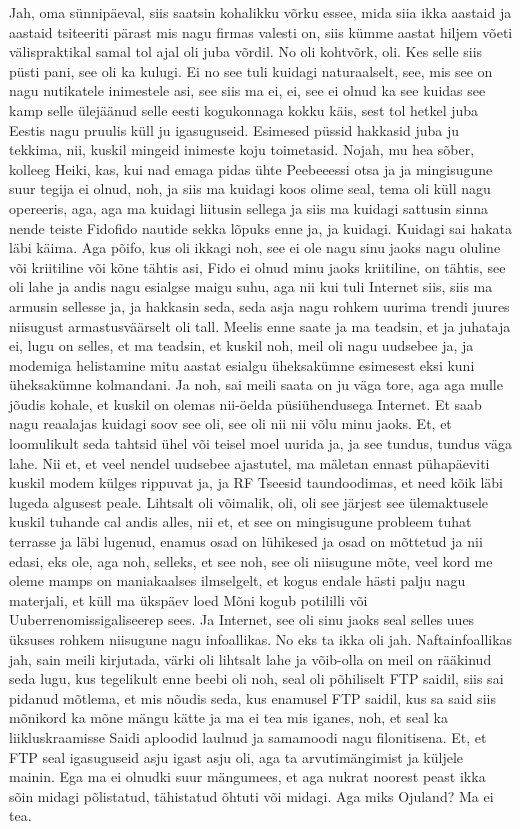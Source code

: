 Jah, oma sünnipäeval, siis saatsin kohalikku võrku essee, mida siia ikka aastaid ja aastaid tsiteeriti pärast mis nagu firmas valesti on, siis kümme aastat hiljem võeti välispraktikal samal tol ajal oli juba võrdil. No oli kohtvõrk, oli. Kes selle siis püsti pani, see oli ka kulugi. Ei no see tuli kuidagi naturaalselt, see, mis see on nagu nutikatele inimestele asi, see siis ma ei, ei, see ei olnud ka see kuidas see kamp selle ülejäänud selle eesti kogukonnaga kokku käis, sest tol hetkel juba Eestis nagu pruulis küll ju igasuguseid. Esimesed püssid hakkasid juba ju tekkima, nii, kuskil mingeid inimeste koju toimetasid. Nojah, mu hea sõber, kolleeg Heiki, kas, kui nad emaga pidas ühte Peebeeessi otsa ja ja mingisugune suur tegija ei olnud, noh, ja siis ma kuidagi koos olime seal, tema oli küll nagu opereeris, aga, aga ma kuidagi liitusin sellega ja siis ma kuidagi sattusin sinna nende teiste Fidofido nautide sekka lõpuks enne ja, ja kuidagi. Kuidagi sai hakata läbi käima. Aga põifo, kus oli ikkagi noh, see ei ole nagu sinu jaoks nagu oluline või kriitiline või kõne tähtis asi, Fido ei olnud minu jaoks kriitiline, on tähtis, see oli lahe ja andis nagu esialgse maigu suhu, aga nii kui tuli Internet siis, siis ma armusin sellesse ja, ja hakkasin seda, seda asja nagu rohkem uurima trendi juures niisugust armastusväärselt oli tall.
Meelis enne saate ja ma teadsin, et ja juhataja ei, lugu on selles, et ma teadsin, et kuskil noh, meil oli nagu uudsebee ja, ja modemiga helistamine mitu aastat esialgu üheksakümne esimesest eksi kuni üheksakümne kolmandani. Ja noh, sai meili saata on ju väga tore, aga aga mulle jõudis kohale, et kuskil on olemas nii-öelda püsiühendusega Internet. Et saab nagu reaalajas kuidagi soov see oli, see oli nii nii võlu minu jaoks. Et, et loomulikult seda tahtsid ühel või teisel moel uurida ja, ja see tundus, tundus väga lahe. Nii et, et veel nendel uudsebee ajastutel, ma mäletan ennast pühapäeviti kuskil modem külges rippuvat ja, ja RF Tseesid taundoodimas, et need kõik läbi lugeda algusest peale.
Lihtsalt oli võimalik, oli, oli see järjest see ülemaktusele kuskil tuhande cal andis alles, nii et, et see on mingisugune probleem tuhat terrasse ja läbi lugenud, enamus osad on lühikesed ja osad on mõttetud ja nii edasi, eks ole, aga noh, selleks, et see noh, see oli niisugune mõte, veel kord me oleme mamps on maniakaalses ilmselgelt, et kogus endale hästi palju nagu materjali, et küll ma ükspäev loed
Mõni kogub potililli või Uuberrenomissigaliseerep sees. Ja Internet, see oli sinu jaoks seal selles uues üksuses rohkem niisugune nagu infoallikas. No eks ta ikka oli jah. Naftainfoallikas jah, sain meili kirjutada, värki oli lihtsalt lahe ja võib-olla on meil on rääkinud seda lugu, kus tegelikult enne beebi oli noh, seal oli põhiliselt FTP saidil, siis sai pidanud mõtlema, et mis nõudis seda, kus enamusel FTP saidil, kus sa said siis mõnikord ka mõne mängu kätte ja ma ei tea mis iganes, noh, et seal ka liikluskraamisse Saidi aploodid laulnud ja samamoodi nagu filonitisena. Et, et FTP seal igasuguseid asju igast asju oli, aga ta arvutimängimist ja küljele mainin. Ega ma ei olnudki suur mängumees, et aga nukrat noorest peast ikka sõin midagi põlistatud, tähistatud õhtuti või midagi. Aga miks Ojuland? Ma ei tea.
